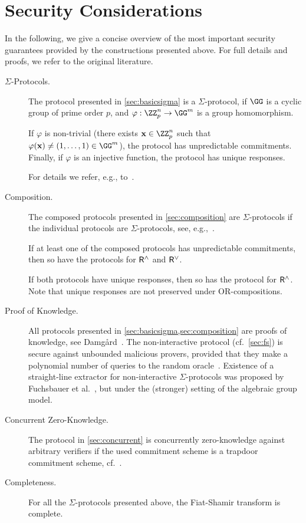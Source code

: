 \documentclass[runningheads,11pt]{article}
\begin{document}
\section{Security Considerations}

In the following, we give a concise overview of the most important security guarantees provided by the constructions presented above.
For full details and proofs, we refer to the original literature.

\begin{description}
  \item[$\Sigma$-Protocols.]
  The protocol presented in \cref{sec:basicsigma} is a $\Sigma$-protocol, if $\GG$ is a cyclic group of prime order $p$, and $\varphi:\ZZ_p^n\to\GG^m$ is a group homomorphism.

  If $\varphi$ is non-trivial (there exists $\vec x\in\ZZ_p^n$ such that $\varphi(\vec x)\ne (1,\dots,1)\in\GG^m$), the protocol has unpredictable commitments.
  Finally, if $\varphi$ is an injective function, the protocol has unique responses.

  For details we refer, e.g., to~\cite{cramer97}.

  \item[Composition.]
    The composed protocols presented in \cref{sec:composition} are $\Sigma$-protocols if the individual protocols are $\Sigma$-protocols, see, e.g.,~\cite{C:CraDamSch94}.

  If at least one of the composed protocols has unpredictable commitments, then so have the protocols for $\mathsf{R}^\land$ and $\mathsf{R}^\lor$.

  If both protocols have unique responses, then so has the protocol for $\mathsf{R}^\land$.
  Note that unique responses are not preserved under OR-compositions.

  \item[Proof of Knowledge.]
    All protocols presented in \cref{sec:basicsigma,sec:composition} are proofs of knowledge, see Damg\r{a}rd~\cite{damgard04}.
    The non-interactive protocol (cf.\ \cref{sec:fs}) is secure against unbounded malicious provers, provided that they make a polynomial number of queries to the random oracle~\cite{JC:PoiSte00}.
    {Existence of a straight-line extractor for non-interactive $\Sigma$-protocols was proposed by Fuchsbauer et al.~\cite{C:FucKilLos18}, but under the (stronger) setting of the algebraic group model.}
  \item[Concurrent Zero-Knowledge.]
    The protocol in \cref{sec:concurrent} is concurrently zero-knowledge against arbitrary verifiers if the used commitment scheme is a trapdoor commitment scheme, cf.~\cite{EC:Damgard00}.
%
  \item[Completeness.]
    For all the $\Sigma$-protocols presented above, the Fiat-Shamir transform is complete.



\end{description}
\end{document}
